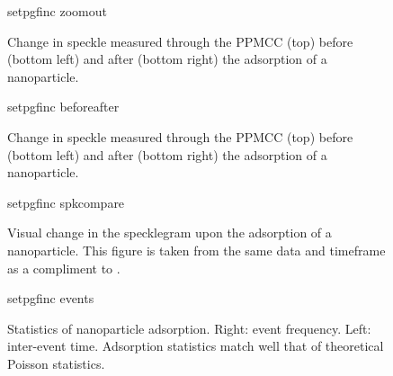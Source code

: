 \begin{figure}
  \centering
  {setpgfinc}
  {zoomout}
  \caption{Change in speckle measured through the PPMCC (top) before (bottom
    left) and after (bottom right) the adsorption of a nanoparticle.  }
  \label{fig:zoomout}
\end{figure}

\begin{figure}
  \centering
  {setpgfinc}
  {beforeafter}
  \caption{Change in speckle measured through the PPMCC (top) before (bottom
    left) and after (bottom right) the adsorption of a nanoparticle.  }
  \label{fig:scattbeforeafterone}
\end{figure}

\begin{figure}
  \centering
  {setpgfinc}
  {spkcompare}
  \caption{Visual change in the specklegram upon the adsorption of a
    nanoparticle.  This figure is taken from the same data and timeframe
    as a compliment to .}
  \label{fig:scattspkcomparetwo}
\end{figure}

\begin{figure}
  \centering
  {setpgfinc}
  {events}
  \caption{Statistics of nanoparticle adsorption.  Right: event frequency.
    Left: inter-event time.  Adsorption statistics match well that of theoretical
    Poisson statistics.}
  \label{fig:scattbeforeafterthree}
\end{figure}

